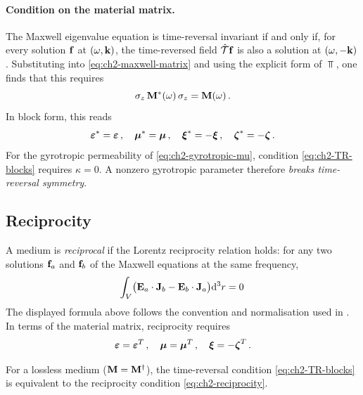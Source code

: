 \paragraph{Condition on the material matrix.}
The Maxwell eigenvalue equation is time-reversal invariant if and only
if, for every solution $\mathbf{f}$ at $(\omega,\mathbf{k})$, the
time-reversed field $\hat{\mathcal{T}}\mathbf{f}$ is also a solution at
$(\omega,-\mathbf{k})$.  Substituting into \eqref{eq:ch2-maxwell-matrix} and
using the explicit form of $\Top$, one finds that this requires
\begin{equation}\label{eq:ch2-TR-condition}
  \sigma_z\,\mathbf{M}^*(\omega)\,\sigma_z = \mathbf{M}(\omega)\,.
\end{equation}
In block form, this reads
\begin{equation}\label{eq:ch2-TR-blocks}
  \boldsymbol{\varepsilon}^* = \boldsymbol{\varepsilon}\,,\quad
  \boldsymbol{\mu}^* = \boldsymbol{\mu}\,,\quad
  \boldsymbol{\xi}^* = -\boldsymbol{\xi}\,,\quad
  \boldsymbol{\zeta}^* = -\boldsymbol{\zeta}\,.
\end{equation}
For the gyrotropic permeability of \eqref{eq:ch2-gyrotropic-mu},
condition \eqref{eq:ch2-TR-blocks} requires $\kappa=0$.  A nonzero
gyrotropic parameter therefore \emph{breaks time-reversal symmetry}.

\subsection{Reciprocity}
\label{sec:ch2-reciprocity}

A medium is \emph{reciprocal} if the Lorentz reciprocity relation holds:
for any two solutions $\mathbf{f}_a$ and $\mathbf{f}_b$ of the Maxwell
equations at the same frequency,
\begin{equation}
  \int_V\bigl(
    \mathbf{E}_a\cdot\mathbf{J}_b - \mathbf{E}_b\cdot\mathbf{J}_a
  \bigr)\mathrm{d}^3r = 0\,
\end{equation}
The displayed formula above follows the convention and normalisation used in \cite{v2024exact}.
In terms of the material matrix, reciprocity requires
\begin{equation}\label{eq:ch2-reciprocity}
  \boldsymbol{\varepsilon} = \boldsymbol{\varepsilon}^T\,,\quad
  \boldsymbol{\mu} = \boldsymbol{\mu}^T\,,\quad
  \boldsymbol{\xi} = -\boldsymbol{\zeta}^T\,.
\end{equation}

\begin{proposition}
  \label{prop:ch2-TR-reciprocal}
  For a lossless medium ($\mathbf{M}=\mathbf{M}^\dagger$), the time-reversal
  condition \eqref{eq:ch2-TR-blocks} is equivalent to the reciprocity
  condition \eqref{eq:ch2-reciprocity}.
\end{proposition}

